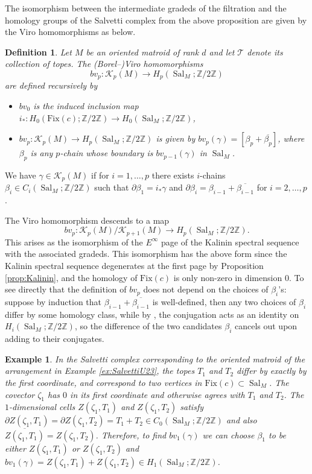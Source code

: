 \documentclass{amsart}
\newtheorem{definition}[theorem]{Definition}
\newtheorem{example}[theorem]{Example}
\newcommand\Kcal{{\mathcal K}}
\newcommand\Ztwo{{\mathbb Z}/2{\mathbb Z}}
\DeclareMathOperator{\Sal}{Sal}
\begin{document}
{The isomorphism between the intermediate gradeds of the filtration and the homology groups of the Salvetti complex from the above proposition are given by the Viro homomorphisms \cite{Degtyarev} as below.

\begin{definition} \label{def:Kalinin_Z2Z}
Let $M$ be an oriented matroid of rank $d$ and let $\mathcal{T}$ denote its collection of topes. 
The {\em (Borel--)Viro homomorphisms}
$$bv_p:\Kcal_{p}(M) \rightarrow H_p(\Sal_M;\Ztwo)$$ are defined recursively by 

\begin{itemize}
\item $bv_0$ is the induced inclusion map $i_{\ast} : H_0(\text{Fix}(c) ;\Ztwo) \to H_0(\Sal_M; \Ztwo)$,
\item $bv_p:\Kcal_{p}(M) \rightarrow H_p(\Sal_M;\Ztwo)$ 
is given by $bv_p(\gamma) = 
[\beta_p+\overline{\beta_p}]$,
where $\beta_p$ is any $p$-chain whose boundary is $bv_{p-1}(\gamma)$ in $\Sal_M$.
\end{itemize}
\end{definition}

We have $\gamma \in\Kcal_p(M)$ if for $i = 1, \ldots , p$ there exists $i$-chains $\beta_i \in C_i(\Sal_M; \Ztwo)$ such that $\partial\beta_1= i_{\ast}\gamma$ and $\partial\beta_i=\beta_{i-1}+\overline{\beta_{i-1}}$ for $i=2,\ldots,p$.


The Viro homomorphism descends to a map $$bv_p:\Kcal_p(M)/ \Kcal_{p+1} (M) \rightarrow H_p(\Sal_M;\Ztwo).$$ This arises as the isomorphism of the $E^{\infty}$ page of the Kalinin spectral sequence with the associated gradeds. This isomorphism has the above form since the Kalinin spectral sequence degenerates at the first page by Proposition \ref{prop:Kalinin}, and the homology of $\text{Fix}(c)$ is only non-zero in dimension $0$. 
To see directly that the definition of $bv_p$ does not depend on the choices of $\beta_i$'s:
suppose by induction that $\beta_{i-1}+\overline{\beta_{i-1}}$ is well-defined, then any two choices of $\beta_i$ differ by some homology class, while by \cite[Corollary~A.2]{Wil78}, the conjugation acts as an identity on $H_i(\Sal_M;\Ztwo)$, so the difference of the two candidates $\beta_i$ cancels out upon adding to their conjugates.


\begin{example} \rm
In the Salvetti complex corresponding to the oriented matroid of the arrangement in Example \ref{ex:SalvettiU23}, the topes $T_1$ and $T_2$ differ by exactly by the first coordinate, and correspond to two vertices in $\text{Fix}(c) \subset \Sal_M$.
The covector $\zeta_1$ has $0$ in its first coordinate and otherwise agrees with $T_1$ and $T_2$. 
The $1$-dimensional cells $Z(\zeta_1,T_1)$ and $Z(\zeta_1,T_2)$ satisfy $\partial Z(\zeta_1,T_1) = \partial Z(\zeta_1,T_2) = T_1 + T_2 \in C_0(\Sal_M; \Ztwo)$ and also $\overline{Z(\zeta_1,T_1)} = Z(\zeta_1,T_2)$.
Therefore, to find $bv_1(\gamma)$ we can choose $\beta_1$ to be either $Z(\zeta_1,T_1)$ or $Z(\zeta_1,T_2)$ and $bv_1(\gamma) = Z(\zeta_1,T_1) + Z(\zeta_1,T_2) \in H_1(\Sal_M; \Ztwo)$.


\end{example}}
\end{document}
